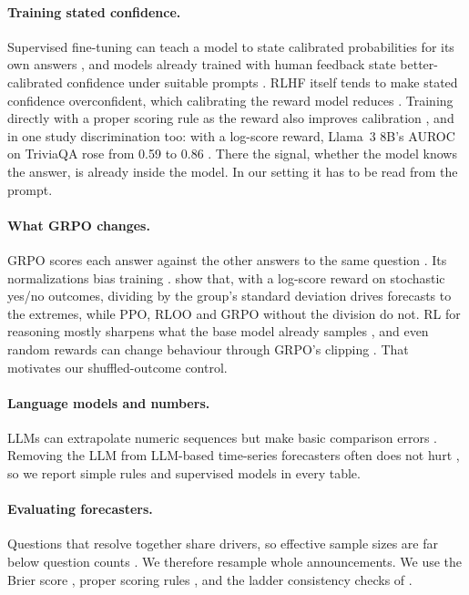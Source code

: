 \documentclass[11pt]{article}
\begin{document}
\paragraph{Training stated confidence.} Supervised fine-tuning can teach a model to state calibrated probabilities for its own answers \citep{lin2022teaching}, and models already trained with human feedback state better-calibrated confidence under suitable prompts \citep{tian2023just}. RLHF itself tends to make stated confidence overconfident, which calibrating the reward model reduces \citep{leng2025taming}. Training directly with a proper scoring rule as the reward also improves calibration \citep{baniharouni2026rewarding,damani2026beyond}, and in one study discrimination too: with a log-score reward, Llama~3 8B's AUROC on TriviaQA rose from 0.59 to 0.86 \citep{baniharouni2026rewarding}. There the signal, whether the model knows the answer, is already inside the model. In our setting it has to be read from the prompt.

\paragraph{What GRPO changes.} GRPO scores each answer against the other answers to the same question \citep{shao2024deepseekmath}. Its normalizations bias training \citep{liu2025understanding}. \citet{bereket2025uncalibrated} show that, with a log-score reward on stochastic yes/no outcomes, dividing by the group's standard deviation drives forecasts to the extremes, while PPO, RLOO and GRPO without the division do not. RL for reasoning mostly sharpens what the base model already samples \citep{yue2025doesrl}, and even random rewards can change behaviour through GRPO's clipping \citep{shao2026spurious}. That motivates our shuffled-outcome control.

\paragraph{Language models and numbers.} LLMs can extrapolate numeric sequences \citep{gruver2023llmtime} but make basic comparison errors \citep{yang2025numbercookbook}. Removing the LLM from LLM-based time-series forecasters often does not hurt \citep{tan2024useful}, so we report simple rules and supervised models in every table.

\paragraph{Evaluating forecasters.} Questions that resolve together share drivers, so effective sample sizes are far below question counts \citep{paleka2025pitfalls}. We therefore resample whole announcements. We use the Brier score \citep{brier1950verification}, proper scoring rules \citep{gneiting2007strictly}, and the ladder consistency checks of \citet{paleka2025consistency}.
\end{document}

